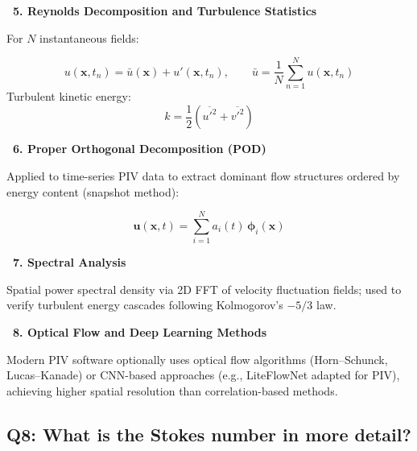\documentclass[12pt,a4paper]{article}
\begin{document}
\begin{answerbox}
\vspace{0.5em}
\textbf{\color{accentpurple}~5. Reynolds Decomposition and Turbulence Statistics}

For $N$ instantaneous fields:
\begin{mathbox}
\begin{equation}
    u(\mathbf{x}, t_n) = \bar{u}(\mathbf{x}) + u'(\mathbf{x}, t_n), \qquad
    \bar{u} = \frac{1}{N}\sum_{n=1}^{N} u(\mathbf{x}, t_n)
\end{equation}
Turbulent kinetic energy:
\begin{equation}
    k = \frac{1}{2}\!\left(\overline{u'^2} + \overline{v'^2}\right)
\end{equation}
\end{mathbox}

\vspace{0.5em}
\textbf{\color{accentpurple}~6. Proper Orthogonal Decomposition (POD)}

Applied to time-series PIV data to extract dominant flow structures ordered by energy content (snapshot method):
\begin{mathbox}
\begin{equation}
    \mathbf{u}(\mathbf{x}, t) = \sum_{i=1}^{N} a_i(t)\,\boldsymbol{\phi}_i(\mathbf{x})
\end{equation}
\end{mathbox}

\vspace{0.5em}
\textbf{\color{accentpurple}~7. Spectral Analysis}

Spatial power spectral density via 2D FFT of velocity fluctuation fields; used to verify turbulent energy cascades following Kolmogorov's $-5/3$ law.

\vspace{0.5em}
\textbf{\color{accentpurple}~8. Optical Flow and Deep Learning Methods}

Modern PIV software optionally uses optical flow algorithms (Horn--Schunck, Lucas--Kanade) or CNN-based approaches (e.g., LiteFlowNet adapted for PIV), achieving higher spatial resolution than correlation-based methods.
\end{answerbox}

\subsection{Q8: What is the Stokes number in more detail?}
\end{document}
